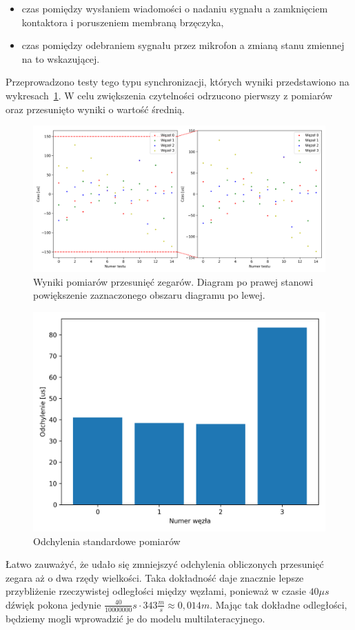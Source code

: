 \begin{itemize}
    \item czas pomiędzy wysłaniem wiadomości o nadaniu sygnału a zamknięciem kontaktora i poruszeniem membraną brzęczyka,
    \item czas pomiędzy odebraniem sygnału przez mikrofon a zmianą stanu zmiennej na to wskazującej.
\end{itemize}

Przeprowadzono testy tego typu synchronizacji, których wyniki przedstawiono na wykresach~\ref{pic:mic_sync}. W celu zwiększenia czytelności odrzucono pierwszy z pomiarów oraz przesunięto wyniki o wartość średnią.

\begin{figure}[H]
    \centering
    \includegraphics[width=\textwidth]{pics/mic_sync/offsets.png}
    \caption[Wyniki pomiarów przesunięć zegarów]{Wyniki pomiarów przesunięć zegarów. Diagram po prawej stanowi powiększenie zaznaczonego obszaru diagramu po lewej.}
    \label{pic:mic_sync}
\end{figure}

\begin{figure}[H]
    \centering
    \includegraphics[width=.49\textwidth]{pics/mic_sync/stddev_offsets.png}
    \caption{Odchylenia standardowe pomiarów}
    \label{pic:stddev_mic}
\end{figure}

Łatwo zauważyć, że udało się zmniejszyć odchylenia obliczonych przesunięć zegara aż o dwa rzędy wielkości. Taka dokładność daje znacznie lepsze przybliżenie rzeczywistej odległości między węzłami, ponieważ w czasie $40 \mu s$ dźwięk pokona jedynie $\frac{40}{10000000}s \cdot 343 \frac{m}{s} \approx 0,014m$. Mając tak dokładne odległości, będziemy mogli wprowadzić je do modelu multilateracyjnego.

